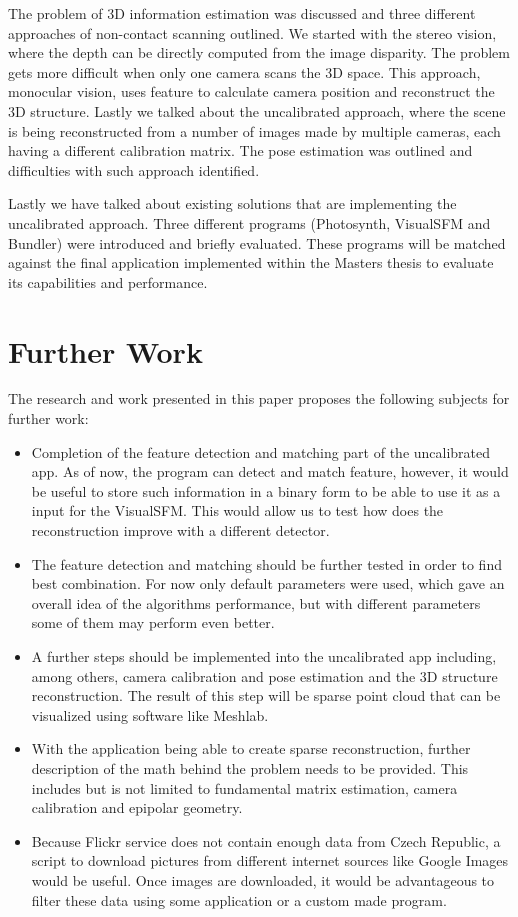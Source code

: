 The problem of 3D information estimation was discussed and three different approaches of non-contact scanning outlined. We started with the stereo vision, where the depth can be directly computed from the image disparity. The problem gets more difficult when only one camera scans the 3D space. This approach, monocular vision, uses feature to calculate camera position and reconstruct the 3D structure. Lastly we talked about the uncalibrated approach, where the scene is being reconstructed from a number of images made by multiple cameras, each having a different calibration matrix. The pose estimation was outlined and difficulties with such approach identified.

Lastly we have talked about existing solutions that are implementing the uncalibrated approach. Three different programs (Photosynth, VisualSFM and Bundler) were introduced and briefly evaluated. These programs will be matched against the final application implemented within the Masters thesis to evaluate its capabilities and performance.

\section{Further Work}
The research and work presented in this paper proposes the following subjects for further work:
\begin{itemize}
	\item Completion of the feature detection and matching part of the uncalibrated app. As of now, the program can detect and match feature, however, it would be useful to store such information in a binary form to be able to use it as a input for the VisualSFM. This would allow us to test how does the reconstruction improve with a different detector.
	
	\item The feature detection and matching should be further tested in order to find best combination. For now only default parameters were used, which gave an overall idea of the algorithms performance, but with different parameters some of them may perform even better.
	
	\item A further steps should be implemented into the uncalibrated app including, among others, camera calibration and pose estimation and the 3D structure reconstruction. The result of this step will be sparse point cloud that can be visualized using software like Meshlab.
	
	\item With the application being able to create sparse reconstruction, further description of the math behind the problem needs to be provided. This includes but is not limited to fundamental matrix estimation, camera calibration and epipolar geometry.
	
	\item Because Flickr service does not contain enough data from Czech Republic, a script to download pictures from different internet sources like Google Images would be useful. Once images are downloaded, it would be advantageous to filter these data using some application or a custom made program.
\end{itemize}
